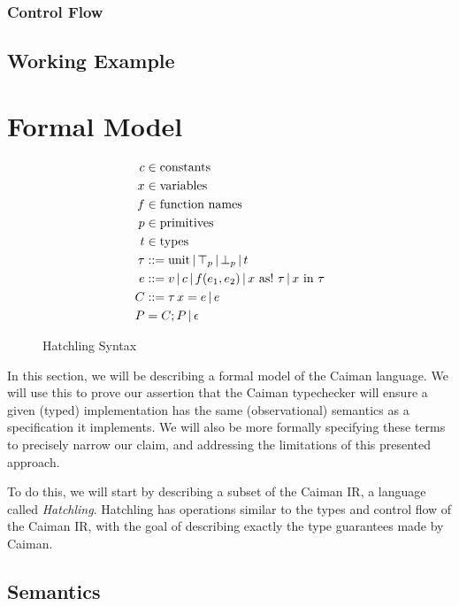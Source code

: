\subsubsection{Control Flow}

\subsection{Working Example}

\section{Formal Model}
\label{sec:formal}

\begin{figure}
\begin{align*}
	c &\in\text{constants}\\
	x &\in\text{variables}\\
	f &\in \text{function names}\\
	p &\in\text{primitives}\\
	t &\in\text{types} \\
	\tau &\defas \textrm{unit} \,|\, \top_p \,|\, \bot_p \,|\, t \\
	e &\defas v \,|\, c \,|\, f(e_1, e_2) \,|\, x\ \textrm{as!}\ \tau \,|\, x\ \textrm{in}\ \tau\\
	C &\defas \tau \, x = e \,|\, e\\
	P  &=  C;P \,|\, \epsilon\\
\end{align*}
\caption{Hatchling Syntax}
\label{fig:syntax}
\end{figure}

In this section, we will be describing a formal model of the Caiman language. We will use this to prove our assertion that the Caiman typechecker will ensure a given (typed) implementation has the same (observational) semantics as a specification it implements.  We will also be more formally specifying these terms to precisely narrow our claim, and addressing the limitations of this presented approach.

To do this, we will start by describing a subset of the Caiman IR, a language called \textit{Hatchling}.  Hatchling has operations similar to the types and control flow of the Caiman IR, with the goal of describing exactly the type guarantees made by Caiman.



\subsection{Semantics}

